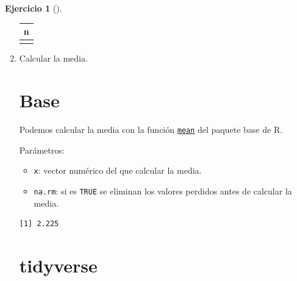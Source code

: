 \documentclass[
  spanish,
  a4paper,
]{scrreport}
\newenvironment{Shaded}{\begin{snugshade}}{\end{snugshade}}
\newcommand{\FunctionTok}[1]{\textcolor[rgb]{0.28,0.35,0.67}{#1}}
\newcommand{\NormalTok}[1]{\textcolor[rgb]{0.00,0.23,0.31}{#1}}
\newcommand{\SpecialCharTok}[1]{\textcolor[rgb]{0.37,0.37,0.37}{#1}}
\providecommand{\tightlist}{%
  \setlength{\itemsep}{0pt}\setlength{\parskip}{0pt}}
\theoremstyle{definition}
\newtheorem{exercise}{Ejercicio}[chapter]
\theoremstyle{remark}
\begin{document}
\begin{exercise}[]
\begin{enumerate}
\begin{tcolorbox}
  \begin{longtable}[]{@{}r@{}}
  \toprule\noalign{}
  n \\
  \midrule\noalign{}
  \endhead
  \bottomrule\noalign{}
  \endlastfoot
  40 \\
  \end{longtable}

  \end{tcolorbox}
\item
  Calcular la media.

  \begin{tcolorbox}[enhanced jigsaw, colback=white, coltitle=black, toprule=.15mm, rightrule=.15mm, opacitybacktitle=0.6, opacityback=0, bottomtitle=1mm, toptitle=1mm, titlerule=0mm, breakable, leftrule=.75mm, title=\textcolor{quarto-callout-tip-color}{\faLightbulb}\hspace{0.5em}{Solución}, arc=.35mm, left=2mm, bottomrule=.15mm, colframe=quarto-callout-tip-color-frame, colbacktitle=quarto-callout-tip-color!10!white]

  \section{Base}

  Podemos calcular la media con la función
  \href{https://www.rdocumentation.org/packages/base/versions/3.6.2/topics/mean}{\texttt{mean}}
  del paquete base de R.

  Parámetros:

  \begin{itemize}
  \tightlist
  \item
    \texttt{x}: vector numérico del que calcular la media.
  \item
    \texttt{na.rm}: si es \texttt{TRUE} se eliminan los valores perdidos
    antes de calcular la media.
  \end{itemize}

\begin{Shaded}
\end{Shaded}

\begin{verbatim}
[1] 2.225
\end{verbatim}

  \section{tidyverse}


\end{tcolorbox}
\end{enumerate}
\end{exercise}
\end{document}
